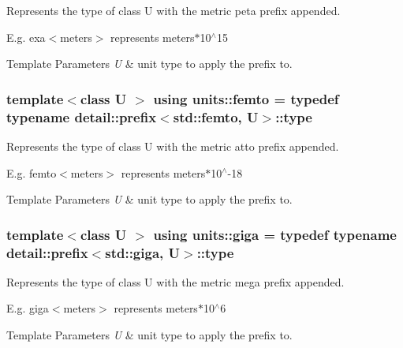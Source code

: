 Represents the type of {\ttfamily class U} with the metric \textquotesingle{}peta\textquotesingle{} prefix appended. 

E.\+g. exa$<$meters$>$ represents meters$\ast$10$^\wedge$15 
\begin{DoxyTemplParams}{Template Parameters}
{\em U} & unit type to apply the prefix to. \\
\hline
\end{DoxyTemplParams}
\hypertarget{group___unit_manipulators_gab3c39c4b3083f6ca59ee0fd0e116f814}{}
\subsubsection[{femto}]{\setlength{\rightskip}{0pt plus 5cm}template$<$class U $>$ using {\bf units\+::femto} = typedef typename detail\+::prefix$<$std\+::femto, U$>$\+::type}\label{group___unit_manipulators_gab3c39c4b3083f6ca59ee0fd0e116f814}


Represents the type of {\ttfamily class U} with the metric \textquotesingle{}atto\textquotesingle{} prefix appended. 

E.\+g. femto$<$meters$>$ represents meters$\ast$10$^\wedge$-\/18 
\begin{DoxyTemplParams}{Template Parameters}
{\em U} & unit type to apply the prefix to. \\
\hline
\end{DoxyTemplParams}
\hypertarget{group___unit_manipulators_ga4595911f659ef61133216da15d61eb07}{}
\subsubsection[{giga}]{\setlength{\rightskip}{0pt plus 5cm}template$<$class U $>$ using {\bf units\+::giga} = typedef typename detail\+::prefix$<$std\+::giga, U$>$\+::type}\label{group___unit_manipulators_ga4595911f659ef61133216da15d61eb07}


Represents the type of {\ttfamily class U} with the metric \textquotesingle{}mega\textquotesingle{} prefix appended. 

E.\+g. giga$<$meters$>$ represents meters$\ast$10$^\wedge$6 
\begin{DoxyTemplParams}{Template Parameters}
{\em U} & unit type to apply the prefix to. \\
\hline
\end{DoxyTemplParams}
\hypertarget{group___unit_manipulators_gaf3fc3cf9567ce9a93f880419c4ddac46}{}
